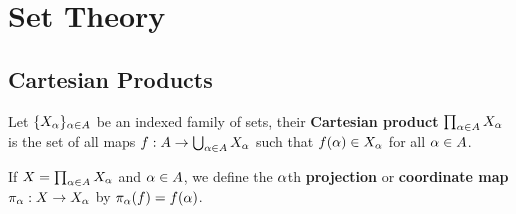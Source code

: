 \chapter{Set Theory}
\section{Cartesian Products}
\begin{definition}
    Let $\{X_\alpha\}_{\alpha \in A}$ be an indexed family of sets, their \textbf{Cartesian product}
    $\prod_{\alpha\in A}X_\alpha$ is the set of all maps $f: A \to \bigcup_{\alpha \in A}X_\alpha$ such that 
    $f(\alpha) \in X_\alpha$ for all $\alpha \in A$. 
\end{definition}
\begin{definition}
    If $X = \prod_{\alpha \in A}X_\alpha$ and $\alpha \in A$, we define the $\alpha$th \textbf{projection} or \textbf{coordinate map} $\pi_\alpha:X \to X_\alpha$ by $\pi_\alpha(f)=f(\alpha)$. 
\end{definition}